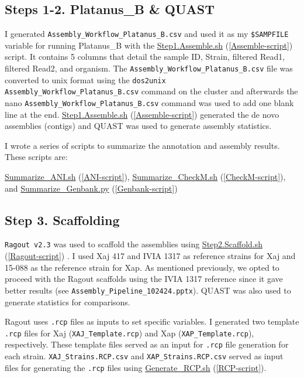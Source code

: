 \documentclass[
]{book}
\begin{document}
\subsection{Steps 1-2. Platanus\_B \& QUAST}\label{steps-1-2.-platanus_b-quast}

I generated \texttt{Assembly\_Workflow\_Platanus\_B.csv} and used it as my \texttt{\$SAMPFILE} variable for running Platanus\_B with the \hyperref[Assemble-script]{Step1.Assemble.sh} (\ref{Assemble-script}) script. It contains 5 columns that detail the sample ID, Strain, filtered Read1, filtered Read2, and organism. The \texttt{Assembly\_Workflow\_Platanus\_B.csv} file was converted to unix format using the \texttt{dos2unix} \texttt{Assembly\_Workflow\_Platanus\_B.csv} command on the cluster and afterwards the nano \texttt{Assembly\_Workflow\_Platanus\_B.csv} command was used to add one blank line at the end. \hyperref[Assemble-script]{Step1.Assemble.sh} (\ref{Assemble-script}) generated the de novo assemblies (contigs) and QUAST was used to generate assembly statistics.

I wrote a series of scripts to summarize the annotation and assembly results. These scripts are:

\hyperref[ANI-script]{Summarize\_ANI.sh} (\ref{ANI-script}), \hyperref[CheckM-script]{Summarize\_CheckM.sh} (\ref{CheckM-script}), and \hyperref[Genbank-script]{Summarize\_Genbank.py} (\ref{Genbank-script})

\subsection{Step 3. Scaffolding}\label{step-3.-scaffolding}

\texttt{Ragout\ v2.3} was used to scaffold the assemblies using \hyperref[Ragout-script]{Step2.Scaffold.sh} (\ref{Ragout-script}) . I used Xaj 417 and IVIA 1317 as reference strains for Xaj and 15-088 as the reference strain for Xap. As mentioned previously, we opted to proceed with the Ragout scaffolds using the IVIA 1317 reference since it gave better results (see \texttt{Assembly\_Pipeline\_102424.pptx}). QUAST was also used to generate statistics for comparisons.

Ragout uses \texttt{.rcp} files as inputs to set specific variables. I generated two template \texttt{.rcp} files for Xaj (\texttt{XAJ\_Template.rcp}) and Xap (\texttt{XAP\_Template.rcp}), respectively. These template files served as an input for \texttt{.rcp} file generation for each strain. \texttt{XAJ\_Strains.RCP.csv} and \texttt{XAP\_Strains.RCP.csv} served as input files for generating the \texttt{.rcp} files using \hyperref[RCP-script]{Generate\_RCP.sh} (\ref{RCP-script}).
\end{document}
